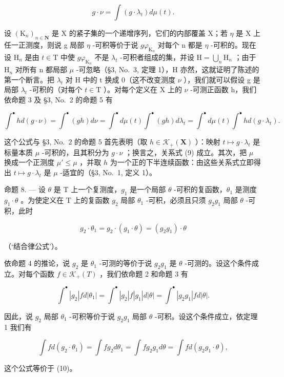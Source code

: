 \[
g \cdot \nu = \int (g \cdot \lambda_ {t}) d \mu (t).\tag{9}
\]

设 \((\mathrm{K}_{n})_{n\in\mathbf{N}}\) 是 X 的紧子集的一个递增序列，它们的内部覆盖 X；若 \(\eta\) 是 X 上任一正测度，则说 g 局部 \(\eta\) -可积等价于说 \(g\varphi_{\mathrm{K}_{n}}\) 对每个 n 都是 \(\eta\) -可积的。现在设 \(\mathrm{H}_{n}\) 是由 \(t\in\mathrm{T}\) 中使 \(g\varphi_{\mathrm{K}_{n}}\) 不是 \(\lambda_{t}\) -可积者组成的集，并设 \(\mathrm{H}=\bigcup_{n}\mathrm{H}_{n}\) ；由于 \(\mathrm{H}_{n}\) 对所有 n 都局部 \(\mu\) -可忽略（§3, No.~3, 定理 1），H 亦然，这就证明了陈述的第一个断言。把 \(\lambda_{t}\) 对 H 中的 t 换成 0（这不改变测度 \(\nu\) ），我们就可以假设 g 是局部 \(\lambda_{t}\) -可积的（对每个 \(t\in\mathrm{T}\) ）。对每个定义在 X 上的 \(\nu\) -可测正函数 h，我们依命题 3 及 §3, No.~2 的命题 5 有

\[
\int^ {\bullet} h d (g \cdot \nu) = \int^ {\bullet} (g h) d \nu = \int^ {\bullet} d \mu (t) \int^ {\bullet} (g h) d \lambda_ {t} = \int^ {\bullet} d \mu (t) \int^ {\bullet} h d (g \cdot \lambda_ {t}).
\]

这个公式与 §3, No.~2 的命题 5 首先表明（取 \(h \in \mathcal{K}_{+}(\mathbf{X})\) ）：映射 \(t \mapsto g \cdot \lambda_{t}\) 是标量本质 \(\mu\) -可积的，且其积分为 \(g \cdot \nu\) ；换言之，关系式 (9) 成立。其次，把 \(\mu\) 换成一个正测度 \(\mu' \leqslant \mu\) ，并取 \(h\) 为一个正的下半连续函数：由这些关系式立即得出 \(t \mapsto g \cdot \lambda_{t}\) 是 \(\mu\) -适宜的（§3, No.~1, 定义 1）。

命题 8. --- 设 \(\theta\) 是 T 上一个复测度，\(g_{1}\) 是一个局部 \(\theta\) -可积的复函数，\(\theta_{1}\) 是测度 \(g_{1} \cdot \theta\) 。为使定义在 T 上的复函数 \(g_{2}\) 局部 \(\theta_{1}\) -可积，必须且只须 \(g_{2} g_{1}\) 局部 \(\theta\) -可积，此时

\[
g _ {2} \cdot \theta_ {1} = g _ {2} \cdot (g _ {1} \cdot \theta) = (g _ {2} g _ {1}) \cdot \theta\tag{10}
\]

（`结合律公式'）。

依命题 4 的推论，说 \(g_{2}\) 是 \(\theta_{1}\) -可测的等价于说 \(g_{2}g_{1}\) 是 \(\theta\) -可测的。设这个条件成立。对每个函数 \(f \in \mathcal{K}_{+}(T)\) ，我们依命题 2 和命题 3 有

\[
\int^ {\bullet} | g _ {2} | f d | \theta_ {1} | = \int^ {\bullet} | g _ {2} | f | g _ {1} | d | \theta | = \int^ {\bullet} | g _ {2} g _ {1} | f d | \theta |.
\]

因此，说 \(g_{2}\) 局部 \(\theta_{1}\) -可积等价于说 \(g_{2}g_{1}\) 局部 \(\theta\) -可积。设这个条件成立，依定理 1 我们有

\[
\int f d \left(g _ {2} \cdot \theta_ {1}\right) = \int f g _ {2} d \theta_ {1} = \int f g _ {2} g _ {1} d \theta = \int f d \left(g _ {2} g _ {1} \cdot \theta\right),
\]

这个公式等价于 (10)。
